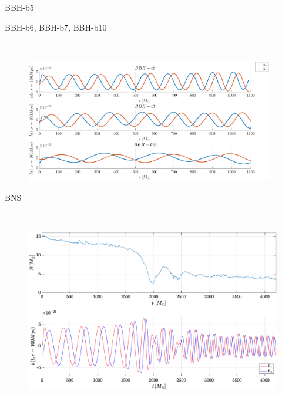 \documentclass{beamer}
\newlength{\offsetpage}
\newenvironment{widepage}{\begin{adjustwidth}{-\offsetpage}{-\offsetpage}%
    \addtolength{\textwidth}{2\offsetpage}}%
{\end{adjustwidth}}
\theoremstyle{definition}
\theoremstyle{plain}
\begin{document}
\begin{frame}{BBH-b5}
\begin{figure}
    \centering
    \end{figure}
\end{frame}

\begin{frame}{BBH-b6, BBH-b7, BBH-b10}
\begin{widepage}
\begin{figure}
    \centering
    \includegraphics[scale=0.3,width=0.97\textwidth]{bbh-b6710.eps}
    \end{figure}
    \end{widepage}
\end{frame}

\begin{frame}{BNS}
\begin{widepage}
\begin{figure}
    \centering
    \includegraphics[scale=0.3,width=1\textwidth]{bns.eps}
    \end{figure}
    \end{widepage}
\end{frame}
\end{document}
